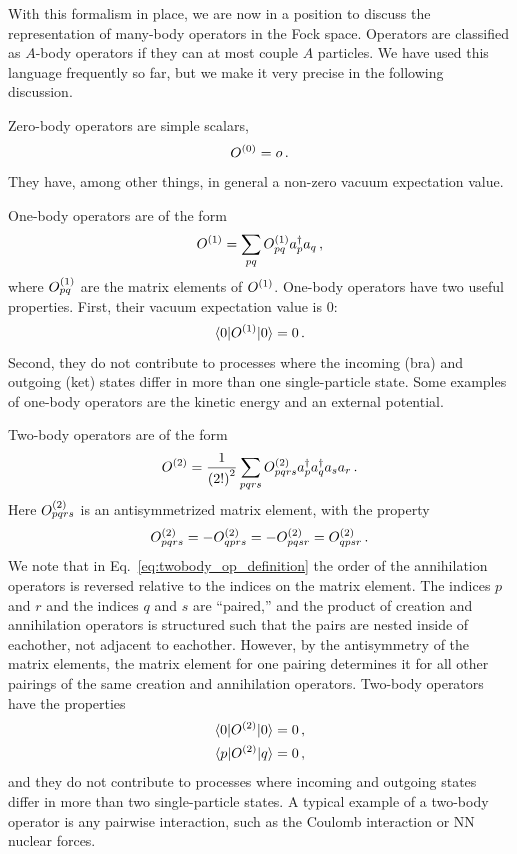 With this formalism in place,
we are now in a position to discuss the representation of many-body operators
in the Fock space.
Operators are classified as $A$-body operators if they can at most couple $A$ particles.
We have used this language frequently so far,
but we make it very precise in the following discussion.

Zero-body operators are simple scalars,
\begin{equation}
  {O}^{(0)} = o\,.
\end{equation}
They have, among other things, in general a non-zero vacuum expectation value.

One-body operators are of the form
\begin{equation}\label{eq:onebody_op_definition}
  {O}^{(1)} = \sum_{pq} {O}^{(1)}_{pq} a_{p}^{\dagger} a_{q}\,,
\end{equation}
where ${O}^{(1)}_{pq}$ are the matrix elements of ${O}^{(1)}$.
One-body operators have two useful properties.
First, their vacuum expectation value is 0:
\begin{equation}
  \braket{0 | {O}^{(1)} | 0} = 0\,.
\end{equation}
Second, they do not contribute to processes
where the incoming (bra) and outgoing (ket) states differ
in more than one single-particle state.
Some examples of one-body operators are the kinetic energy and an external potential.

Two-body operators are of the form
\begin{equation}
  {O}^{(2)} = \frac{1}{{(2!)}^2} \sum_{pqrs} {O}^{(2)}_{pqrs} a_{p}^{\dagger} a_{q}^{\dagger} a_{s} a_{r}\,.\label{eq:twobody_op_definition}
\end{equation}
Here ${O}^{(2)}_{pqrs}$ is an antisymmetrized matrix element, with the property
\begin{equation}
  {O}^{(2)}_{pqrs} = - {O}^{(2)}_{qprs} = - {O}^{(2)}_{pqsr} = {O}^{(2)}_{qpsr}\,.
\end{equation}
We note that in Eq.~\ref{eq:twobody_op_definition}
the order of the annihilation operators is reversed
relative to the indices on the matrix element.
The indices $p$ and $r$ and the indices $q$ and $s$ are ``paired,''
and the product of creation and annihilation operators is structured
such that the pairs are nested inside of eachother,
not adjacent to eachother.
However, by the antisymmetry of the matrix elements,
the matrix element for one pairing determines it
for all other pairings of the same creation and annihilation operators.
Two-body operators have the properties
\begin{align}
  \braket{0 | {O}^{(2)} | 0} & = 0\,,\\
  \braket{p | {O}^{(2)} | q} & = 0\,,
\end{align}
and they do not contribute to processes where incoming and outgoing states
differ in more than two single-particle states.
A typical example of a two-body operator is any pairwise interaction,
such as the Coulomb interaction or NN nuclear forces.

